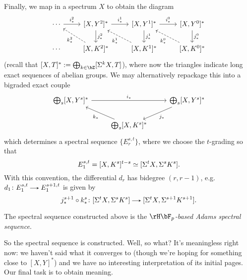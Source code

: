 \begin{construction}
  Finally, we map in a spectrum $X$ to obtain the diagram
  \[
    \begin{tikzcd}
      \cdots \ar[r, "i^2_*"] &
      {[X,Y^2]^*} \ar[r, "i^1_*"] \ar [d, "j^2_*"] &
      {[X,Y^1]^*} \ar[r, "i^0_*"] \ar[d, "j^1_*"] &
      {[X,Y^0]^*} \ar[d, "j^0_*"] \\
      \cdots &
      {[X,K^2]^*} \ar[ul, dashed, "k^2_*"] &
      {[X,K^1]^*} \ar[ul, dashed, "k^1_*"] &
      {[X,K^0]^*} \ar[ul, dashed, "k^0_*"]
    \end{tikzcd}
  \]
  (recall that $[X,T]^* \ce \bigoplus_{k \in \bZ} [\Sigma^k X, T]$), where now the triangles indicate long exact sequences of abelian groups. We may alternatively repackage this into a bigraded exact couple
  \[
    \begin{tikzcd}
      \bigoplus_s [X,Y^s]^* \ar[rr, "i_*"] &
      &
      \bigoplus_s [X,Y^s]^* \ar[ld, "j_*"] \\
      &
      \bigoplus_s [X,K^s]^* \ar[ul, "k_*"]
    \end{tikzcd}
  \]
  which determines a spectral sequence $\{E_r^{s,t}\}$, where we choose the $t$-grading so that
  \begin{equation}
    \label{ss-construction-e1}
    E_1^{s,t} = [X, K^s]^{t-s} \simeq [\Sigma^t X, \Sigma^s K^s].
  \end{equation}
  With this convention, the differential $d_r$ has bidegree $(r,r-1)$, e.g. $d_1 \c E_1^{s,t} \to E_1^{s+1,t}$ is given by
  \[
    j^{s+1}_* \circ k^s_* \c [\Sigma^t X, \Sigma^s K^s] \to [\Sigma^t X, \Sigma^{s+1} K^{s+1}].
  \]

  \begin{subdefinition}
    \label{ss-construction-name}
    The spectral sequence constructed above is the \emph{$\HFp$-based Adams spectral sequence}.
  \end{subdefinition}
\end{construction}

So the spectral sequence is constructed. Well, so what? It's meaningless right now: we haven't said what it converges to (though we're hoping for something close to $[X,Y]^*$) and we have no interesting interpretation of its initial pages. Our final task is to obtain meaning.


